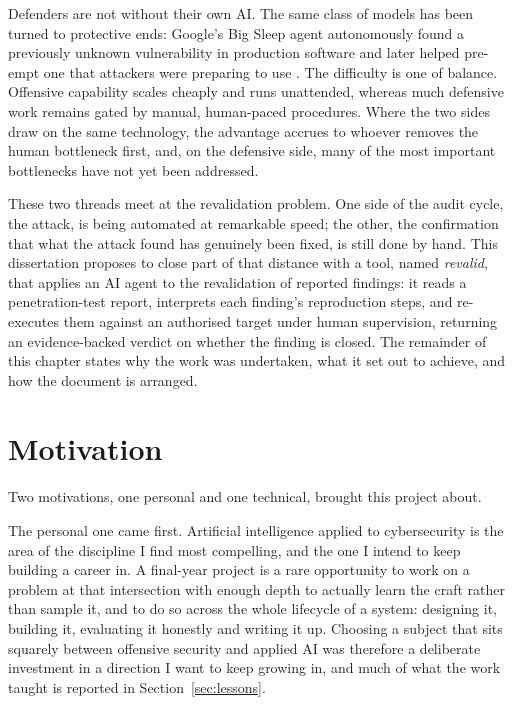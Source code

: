 Defenders are not without their own AI. The same class of models has been turned to
protective ends: Google's Big Sleep agent autonomously found a previously unknown
vulnerability in production software and later helped pre-empt one that attackers
were preparing to use \cite{google_bigsleep}. The difficulty is one of balance.
Offensive capability scales cheaply and runs unattended, whereas much defensive
work remains gated by manual, human-paced procedures. Where the two sides draw on
the same technology, the advantage accrues to whoever removes the human bottleneck
first, and, on the defensive side, many of the most important bottlenecks have
not yet been addressed.

These two threads meet at the revalidation problem. One side of the audit cycle,
the attack, is being automated at remarkable speed; the other, the confirmation that
what the attack found has genuinely been fixed, is still done by hand. This
dissertation proposes to close part of that distance with a tool, named
\emph{revalid}, that applies an AI agent to the revalidation of reported findings:
it reads a penetration-test report, interprets each finding's reproduction steps,
and re-executes them against an authorised target under human supervision, returning
an evidence-backed verdict on whether the finding is closed. The remainder of this
chapter states why the work was undertaken, what it set out to achieve, and how the
document is arranged.

\section{Motivation}
\label{sec:motivation}

Two motivations, one personal and one technical, brought this project about.

The personal one came first. Artificial intelligence applied to cybersecurity is the
area of the discipline I find most compelling, and the one I intend to keep building a
career in. A final-year project is a rare opportunity to work on a problem at that
intersection with enough depth to actually learn the craft rather than sample it, and
to do so across the whole lifecycle of a system: designing it, building it, evaluating
it honestly and writing it up. Choosing a subject that sits squarely between offensive
security and applied AI was therefore a deliberate investment in a direction I want to
keep growing in, and much of what the work taught is reported in
Section~\ref{sec:lessons}.

